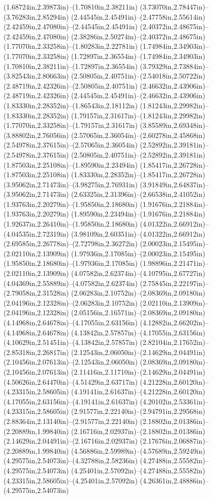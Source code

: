 (1.68724in,2.39873in)--(1.70810in,2.38211in) (3.73070in,2.78447in)--(3.76283in,2.85294in) (2.44545in,2.45491in)--(2.47758in,2.55614in) (2.42459in,2.47080in)--(2.44545in,2.45491in) (2.40372in,2.48675in)--(2.42459in,2.47080in) (2.38286in,2.50274in)--(2.40372in,2.48675in) (1.77070in,2.33258in)--(1.80283in,2.22781in) (1.74984in,2.34903in)--(1.77070in,2.33258in) (1.72897in,2.36554in)--(1.74984in,2.34903in) (1.70810in,2.38211in)--(1.72897in,2.36554in) (3.79329in,2.73884in)--(3.82543in,2.80663in) (2.50805in,2.40751in)--(2.54018in,2.50722in) (2.48719in,2.42326in)--(2.50805in,2.40751in) (2.46632in,2.43906in)--(2.48719in,2.42326in) (2.44545in,2.45491in)--(2.46632in,2.43906in) (1.83330in,2.28352in)--(1.86543in,2.18112in) (1.81243in,2.29982in)--(1.83330in,2.28352in) (1.79157in,2.31617in)--(1.81243in,2.29982in) (1.77070in,2.33258in)--(1.79157in,2.31617in) (3.85589in,2.69348in)--(3.88802in,2.76056in) (2.57065in,2.36054in)--(2.60278in,2.45868in) (2.54978in,2.37615in)--(2.57065in,2.36054in) (2.52892in,2.39181in)--(2.54978in,2.37615in) (2.50805in,2.40751in)--(2.52892in,2.39181in) (1.87503in,2.25108in)--(1.89590in,2.23494in) (1.85417in,2.26728in)--(1.87503in,2.25108in) (1.83330in,2.28352in)--(1.85417in,2.26728in) (3.95062in,2.71473in)--(3.98275in,2.76931in) (3.91849in,2.64837in)--(3.95062in,2.71473in) (2.63325in,2.31396in)--(2.66538in,2.41052in) (1.93763in,2.20279in)--(1.95850in,2.18680in) (1.91676in,2.21884in)--(1.93763in,2.20279in) (1.89590in,2.23494in)--(1.91676in,2.21884in) (1.92637in,2.26410in)--(1.95850in,2.18680in) (4.01322in,2.66912in)--(4.04535in,2.72319in) (3.98109in,2.60351in)--(4.01322in,2.66912in) (2.69585in,2.26778in)--(2.72798in,2.36272in) (2.00023in,2.15495in)--(2.02110in,2.13909in) (1.97936in,2.17085in)--(2.00023in,2.15495in) (1.95850in,2.18680in)--(1.97936in,2.17085in) (1.98896in,2.21471in)--(2.02110in,2.13909in) (4.07582in,2.62374in)--(4.10795in,2.67727in) (4.04369in,2.55889in)--(4.07582in,2.62374in) (2.75845in,2.22197in)--(2.79058in,2.31528in) (2.06283in,2.10752in)--(2.08369in,2.09180in) (2.04196in,2.12328in)--(2.06283in,2.10752in) (2.02110in,2.13909in)--(2.04196in,2.12328in) (2.05156in,2.16571in)--(2.08369in,2.09180in) (4.14968in,2.64678in)--(4.17055in,2.63156in) (4.12882in,2.66202in)--(4.14968in,2.64678in) (4.13842in,2.57857in)--(4.17055in,2.63156in) (4.10629in,2.51451in)--(4.13842in,2.57857in) (2.82104in,2.17652in)--(2.85318in,2.26817in) (2.12543in,2.06050in)--(2.14629in,2.04491in) (2.10456in,2.07613in)--(2.12543in,2.06050in) (2.08369in,2.09180in)--(2.10456in,2.07613in) (2.11416in,2.11710in)--(2.14629in,2.04491in) (4.50626in,2.64470in)--(4.51429in,2.63717in) (4.21228in,2.60120in)--(4.23315in,2.58605in) (4.19141in,2.61637in)--(4.21228in,2.60120in) (4.17055in,2.63156in)--(4.19141in,2.61637in) (4.20102in,2.53361in)--(4.23315in,2.58605in) (2.91577in,2.22140in)--(2.94791in,2.29568in) (2.88364in,2.13140in)--(2.91577in,2.22140in) (2.18802in,2.01386in)--(2.20889in,1.99840in) (2.16716in,2.02937in)--(2.18802in,2.01386in) (2.14629in,2.04491in)--(2.16716in,2.02937in) (2.17676in,2.06887in)--(2.20889in,1.99840in) (4.56886in,2.59989in)--(4.57689in,2.59249in) (4.29575in,2.54073in)--(4.32788in,2.58236in) (4.27488in,2.55582in)--(4.29575in,2.54073in) (4.25401in,2.57092in)--(4.27488in,2.55582in) (4.23315in,2.58605in)--(4.25401in,2.57092in) (4.26361in,2.48886in)--(4.29575in,2.54073in) 